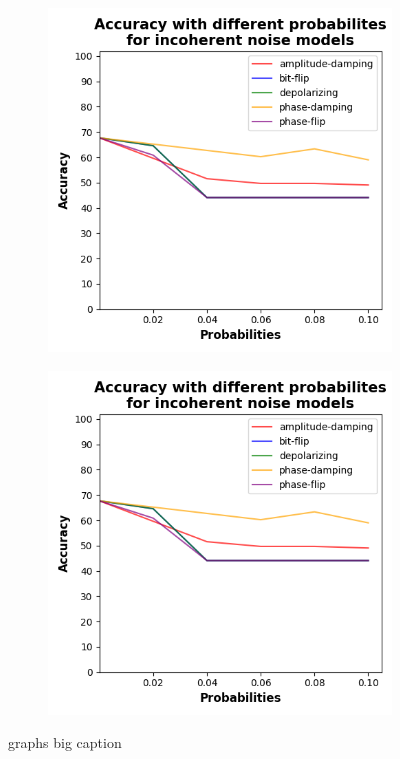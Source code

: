 \begin{figure}[!b]
\medskip

    \begin{subfigure}{0.40\textwidth}
        \includegraphics[width=\linewidth]{figures/accuracy-graph.png}
        \label{fig:arm3}
    \end{subfigure}
    \begin{subfigure}{0.40\textwidth}
        \includegraphics[width=\linewidth]{figures/accuracy-graph.png}
        \label{fig:arm4}
    \end{subfigure}

    \caption{graphs big caption}
\end{figure}

